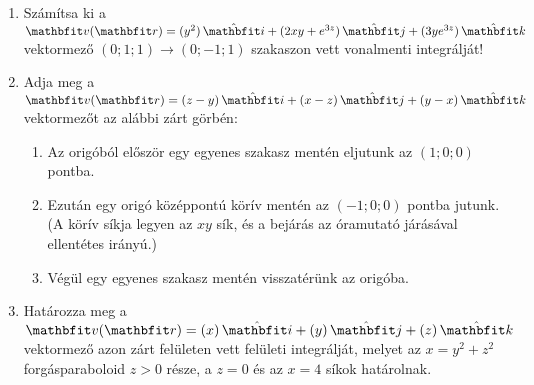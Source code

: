 \documentclass[fleqn]{szb-practice}
\begin{document}
\begin{enumerate}
  \item Számítsa ki a $\rvec v(\coordvec) = \ijk{y^2}{2xy + e^{3z}}{3ye^{3z}}$
        vektormező $(0; 1; 1) \to (0; -1; 1)$ szakaszon vett vonalmenti
        integrálját!

  \item Adja meg a $\rvec v(\coordvec) = \ijk{z - y}{x - z}{y - x}$ vektormezőt
        az alábbi zárt görbén:
        \begin{enumerate}
          \item Az origóból először egy egyenes szakasz mentén eljutunk az
                $(1;0;0)$ pontba.

          \item Ezután egy origó középpontú körív mentén az $(-1;0;0)$ pontba
                jutunk. (A körív síkja legyen az $x y$ sík, és a bejárás
                az óramutató járásával ellentétes irányú.)

          \item Végül egy egyenes szakasz mentén visszatérünk az origóba.
        \end{enumerate}

  \item Határozza meg a $\rvec v(\coordvec) = \ijk{x}{y}{z}$ vektormező
        azon zárt felületen vett felületi integrálját, melyet az
        $x = y^2 + z^2$ forgásparaboloid $z > 0$ része, a $z = 0$ és az
        $x = 4$ síkok határolnak.
\end{enumerate}
\end{document}
